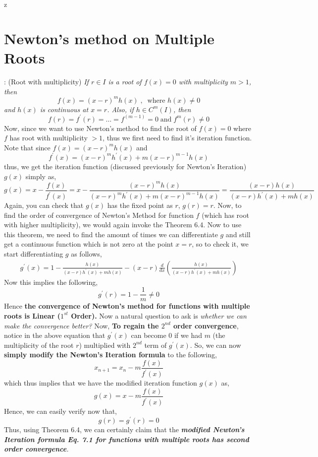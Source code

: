 z\documentclass[a4paper,12pt,twoside]{book}
\newcommand{\nll}[0]{\newline\newline}
\newcommand{\tit}[1]{\textit{#1}}
\newcommand{\defin}[0]{\boxed{\textbf{\textit{Definition}}}}
\begin{document}
\section{Newton's method on Multiple Roots}
\defin  \;: (Root with multiplicity) \textit{If $r \in I$ is a root of $f(x)= 0$ with multiplicity $m>1$, then
\[f(x) = (x-r)^mh(x)\;,\;\; \text{where } h(x)\neq 0 \]
and $h(x)$ is continuous at $x=r$. Also, if $h \in C^m(I)$, then
\[ f(r) = f^\prime(r) = \dots = f^{(m-1)} = 0  \;\text{and}\; f^m(r) \neq 0\]}
Now, since we want to use Newton's method to find the root of $f(x) =0 $ where $f$ has root with multiplicity $>1$, thus we first need to find it's iteration function.
\nll
Note that since $f(x) = (x-r)^mh(x)$ and 
\[ f^\prime(x) = (x-r)^mh^\prime(x) + m(x-r)^{m-1}h(x) \]
thus, we get the iteration function (discussed previously for Newton's Iteration) $g(x)$ simply as,
\[g(x) = x - \frac{f(x)}{f^\prime(x)} = x - \frac{(x-r)^mh(x)}{(x-r)^mh^\prime(x) + m(x-r)^{m-1}h(x)} = \frac{(x-r)h(x)}{(x-r)h^\prime(x) + mh(x)}\]
Again, you can check that $g(x)$ has the fixed point as $r$, $g(r) = r$.
\nll
Now, to find the order of convergence of Newton's Method for function $f$ (which has root with higher multiplicity), we would again invoke the Theorem 6.4. Now to use this theorem, we need to find the amount of times we can differentiate $g$ and still get a continuous function which is not zero at the point $x=r$, so to check it, we start differentiating $g$ as follows,
\begin{equation*}
    \begin{split}
        g^\prime(x) = 1 - \frac{h(x)}{(x-r)h^\prime(x) + mh(x)} - (x-r) \frac{d}{dx} \left( \frac{h(x)}{(x-r)h^\prime(x) + mh(x)} \right)
    \end{split}
\end{equation*}
Now this implies the following,
\[ g^\prime(r) = 1 - \frac{1}{m} \neq 0 \]
Hence \textbf{the convergence of Newton's method for functions with multiple roots is Linear ($1^{st}$ Order).}
\nll
Now a natural question to ask is \tit{whether we can make the convergence better?}
\nll
Now, \textbf{To regain the $2^{nd}$ order convergence}, notice in the above equation that $g^\prime(x)$ can become 0 if we had $m$ (the multiplicity of the root $r$) multiplied with $2^{nd}$ term of $g^\prime(x)$. So, we can now \textbf{simply modify the Newton's Iteration formula} to the following,
\begin{equation}
    \boxed{x_{n+1} = x_n - m\frac{f(x)}{f^\prime(x)}}
\end{equation}
which thus implies that we have the modified iteration function $g(x)$ as,
\[g(x) = x - m\frac{f(x)}{f^\prime(x)}\]
Hence, we can easily verify now that,
\[ g(r) = g^\prime(r) = 0 \]
Thus, using Theorem 6.4, we can certainly claim that the \tit{\textbf{modified Newton's Iteration formula Eq. 7.1 for functions with multiple roots has second order convergence}.}
\end{document}
